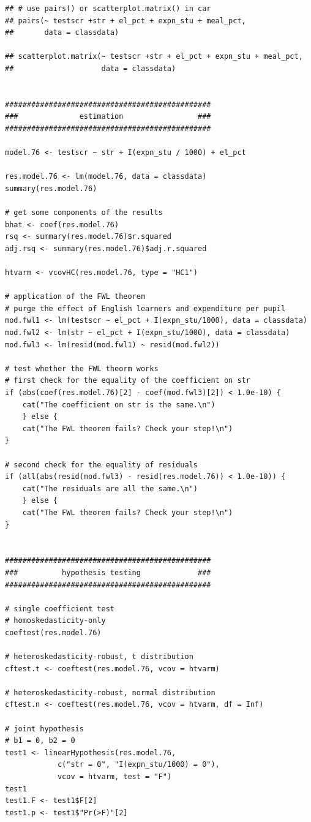 \documentclass[11pt]{article}
\begin{document}
\begin{verbatim}
## # use pairs() or scatterplot.matrix() in car
## pairs(~ testscr +str + el_pct + expn_stu + meal_pct,
##       data = classdata)

## scatterplot.matrix(~ testscr +str + el_pct + expn_stu + meal_pct,
##                    data = classdata)


###############################################
###              estimation                 ###
###############################################

model.76 <- testscr ~ str + I(expn_stu / 1000) + el_pct

res.model.76 <- lm(model.76, data = classdata)
summary(res.model.76)

# get some components of the results
bhat <- coef(res.model.76)
rsq <- summary(res.model.76)$r.squared
adj.rsq <- summary(res.model.76)$adj.r.squared

htvarm <- vcovHC(res.model.76, type = "HC1")

# application of the FWL theorem
# purge the effect of English learners and expenditure per pupil
mod.fwl1 <- lm(testscr ~ el_pct + I(expn_stu/1000), data = classdata)
mod.fwl2 <- lm(str ~ el_pct + I(expn_stu/1000), data = classdata)
mod.fwl3 <- lm(resid(mod.fwl1) ~ resid(mod.fwl2))

# test whether the FWL theorm works
# first check for the equality of the coefficient on str
if (abs(coef(res.model.76)[2] - coef(mod.fwl3)[2]) < 1.0e-10) {
    cat("The coefficient on str is the same.\n")
    } else {
    cat("The FWL theorem fails? Check your step!\n")
}

# second check for the equality of residuals
if (all(abs(resid(mod.fwl3) - resid(res.model.76)) < 1.0e-10)) {
    cat("The residuals are all the same.\n")
    } else {
    cat("The FWL theorem fails? Check your step!\n")
}


###############################################
###          hypothesis testing             ###
###############################################

# single coefficient test
# homoskedasticity-only
coeftest(res.model.76)

# heteroskedasticity-robust, t distribution
cftest.t <- coeftest(res.model.76, vcov = htvarm)

# heteroskedasticity-robust, normal distribution
cftest.n <- coeftest(res.model.76, vcov = htvarm, df = Inf)

# joint hypothesis
# b1 = 0, b2 = 0
test1 <- linearHypothesis(res.model.76,
            c("str = 0", "I(expn_stu/1000) = 0"),
            vcov = htvarm, test = "F")
test1
test1.F <- test1$F[2]
test1.p <- test1$"Pr(>F)"[2]


\end{verbatim}
\end{document}
